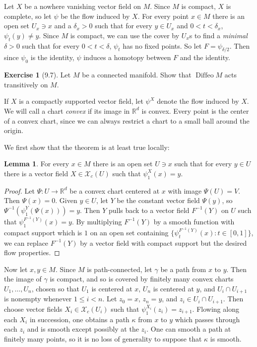 \documentclass[10pt]{article}
\newcommand{\RR}{\mathbb{R}}
\DeclareMathOperator{\Diffeo}{Diffeo}
\theoremstyle{definition}
\newtheorem{exer}{Exercise}
\newtheorem{lemma}{Lemma}[exer]
\begin{document}
Let $X$ be a nowhere vanishing vector field on $M$.
Since $M$ is compact, $X$ is complete, so let $\psi$ be the flow induced by $X$.
For every point $x \in M$ there is an open set $U_x \ni x$ and a $\delta_x > 0$ such that for every $y \in U_x$ and $0 < t < \delta_x$, $\psi_t(y) \neq y$.
Since $M$ is compact, we can use the cover by $U_x$s to find a \emph{minimal} $\delta > 0$ such that for every $0 < t < \delta$, $\psi_t$ has no fixed points.
So let $F = \psi_{\delta/2}$.
Then since $\psi_0$ is the identity, $\psi$ induces a homotopy between $F$ and the identity.

\begin{exer}[9.7]
Let $M$ be a connected manifold. Show that $\Diffeo M$ acts transitively on $M$.
\end{exer}

If $X$ is a compactly supported vector field, let $\psi^X$ denote the flow induced by $X$.
We will call a chart \emph{convex} if its image in $\RR^d$ is convex.
Every point is the center of a convex chart, since we can always restrict a chart to a small ball around the origin.

We first show that the theorem is at least true locally:
\begin{lemma}
For every $x \in M$ there is an open set $U \ni x$ such that for every $y \in U$ there is a vector field $X \in \mathcal X_c(U)$ such that $\psi^X_1(x) = y$.
\end{lemma}
\begin{proof}
Let $\Psi: U \to \RR^d$ be a convex chart centered at $x$ with image $\Psi(U) = V$.
Then $\Psi(x) = 0$. Given $y \in U$, let $Y$ be the constant vector field $\Psi(y)$, so $\Psi^{-1}(\psi^Y_1(\Psi(x))) = y$.
Then $Y$ pulls back to a vector field $F^{-1}(Y)$ on $U$ such that $\psi^{F^{-1}(Y)}_1(x) = y$.
By multiplying $F^{-1}(Y)$ by a smooth function with compact support which is $1$ on an open set containing $\{\psi^{F^{-1}(Y)}_t(x): t \in [0, 1]\}$, we can replace $F^{-1}(Y)$ by a vector field with compact support but the desired flow properties.
\end{proof}

Now let $x, y \in M$.
Since $M$ is path-connected, let $\gamma$ be a path from $x$ to $y$.
Then the image of $\gamma$ is compact, and so is covered by finitely many convex charts $U_1, \dots, U_n$, chosen so that $U_1$ is centered at $x$, $U_n$ is centered at $y$, and $U_i \cap U_{i+1}$ is nonempty whenever $1 \leq i < n$.
Let $z_0 = x$, $z_n = y$, and $z_i \in U_i \cap U_{i+1}$.
Then choose vector fields $X_i \in \mathcal X_c(U_i)$ such that $\psi^{X_i}_1(z_i) = z_{i+1}$.
Flowing along each $X_i$ in succession, one obtains a path $\kappa$ from $x$ to $y$ which passes through each $z_i$ and is smooth except possibly at the $z_i$.
One can smooth a path at finitely many points, so it is no loss of generality to suppose that $\kappa$ is smooth.
\end{document}
